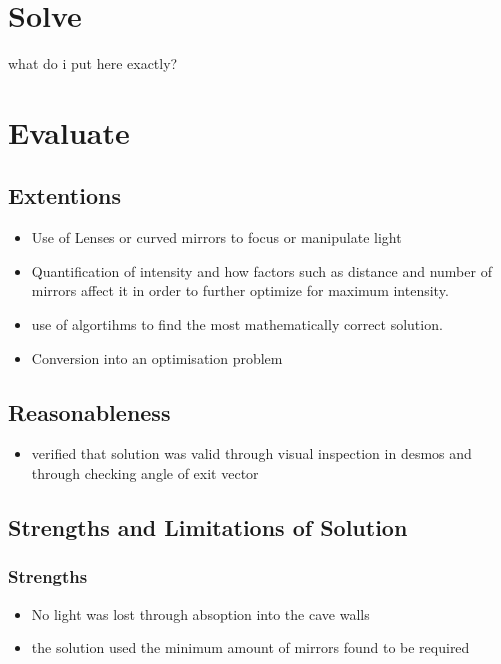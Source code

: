 \documentclass[11pt, letterpaper]{article}
\begin{document}
\par 


\section{Solve}

\par 
what do i put here exactly?

\section{Evaluate}



\subsection{Extentions}
\begin{itemize}
\item Use of Lenses	or curved mirrors to focus or manipulate light 
\item Quantification of intensity and how factors such as distance and number of mirrors affect it in order to further optimize for maximum intensity. 
\item use of algortihms to find the most mathematically correct solution.
\item Conversion into an optimisation problem
	
\end{itemize}



\subsection{Reasonableness}
\begin{itemize}
\item verified that solution was valid through visual inspection in desmos and through checking angle of exit vector
\end{itemize}

\subsection{Strengths and Limitations of Solution}
\subsubsection{Strengths}
\begin{itemize}
\item No light was lost through absoption into the cave walls
\item the solution used the minimum amount of mirrors found to be required
\end{itemize}
\end{document}
